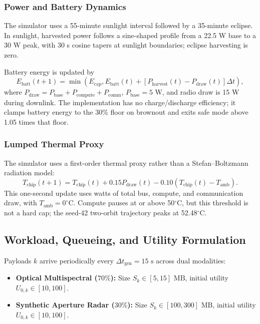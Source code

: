 \documentclass[conference]{IEEEtran}
\begin{document}
\subsubsection{Power and Battery Dynamics}
The simulator uses a 55-minute sunlight interval followed by a 35-minute eclipse. In sunlight, harvested power follows a sine-shaped profile from a 22.5 W base to a 30 W peak, with 30 s cosine tapers at sunlight boundaries; eclipse harvesting is zero.

Battery energy is updated by
\begin{equation}
E_{\text{batt}}(t+1)=\min\left(E_{\text{cap}}, E_{\text{batt}}(t)+[P_{\text{harvest}}(t)-P_{\text{draw}}(t)]\Delta t\right),
\end{equation}
where $P_{\text{draw}}=P_{\text{base}}+P_{\text{compute}}+P_{\text{comm}}$, $P_{\text{base}}=5$ W, and radio draw is 15 W during downlink. The implementation has no charge/discharge efficiency; it clamps battery energy to the 30\% floor on brownout and exits safe mode above 1.05 times that floor.

\subsubsection{Lumped Thermal Proxy}
The simulator uses a first-order thermal proxy rather than a Stefan--Boltzmann radiation model:
\begin{equation}
T_{\text{chip}}(t+1)=T_{\text{chip}}(t)+0.15P_{\text{draw}}(t)-0.10(T_{\text{chip}}(t)-T_{\text{amb}}).
\end{equation}
This one-second update uses watts of total bus, compute, and communication draw, with $T_{\text{amb}}=0^\circ$C. Compute pauses at or above 50$^\circ$C, but this threshold is not a hard cap; the seed-42 two-orbit trajectory peaks at 52.48$^\circ$C.

\subsection{Workload, Queueing, and Utility Formulation}
Payloads $k$ arrive periodically every $\Delta t_{\text{gen}} = 15\text{ s}$ across dual modalities:
\begin{itemize}
    \item \textbf{Optical Multispectral ($70\%$):} Size $S_k \in [5, 15]\text{ MB}$, initial utility $U_{0,k} \in [10, 100]$.
    \item \textbf{Synthetic Aperture Radar ($30\%$):} Size $S_k \in [100, 300]\text{ MB}$, initial utility $U_{0,k} \in [10, 100]$.
\end{itemize}
\end{document}
